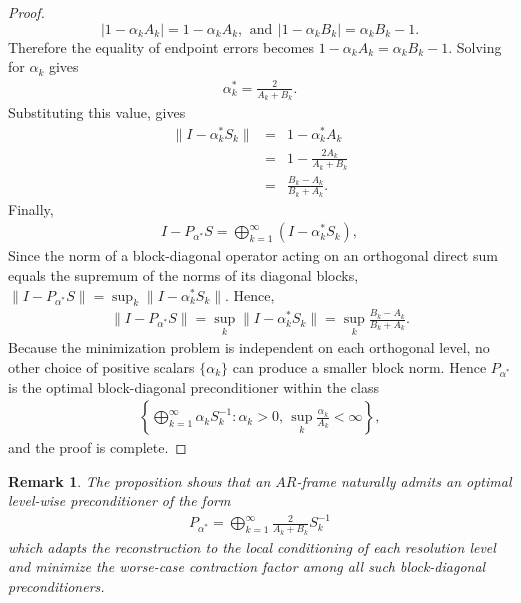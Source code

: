 \documentclass[12pt,titlepage]{amsart}
\newtheorem{rem}[thm]{Remark}
\theoremstyle{definition}
\theoremstyle{remark}
\begin{document}
\begin{proof}
$$|1-\alpha_k A_k| = 1-\alpha_k A_k, \,\ \mbox{and} \,\ |1-\alpha_k B_k| =
\alpha_k B_k-1.$$ Therefore the equality of endpoint errors
becomes $1-\alpha_k A_k = \alpha_k B_k-1$. Solving for $\alpha_k$
gives
\begin{eqnarray*}
\alpha_k^* = \frac{2}{A_k+B_k}.
\end{eqnarray*}
 Substituting this value, gives
\begin{eqnarray*}
\|I-\alpha_k^*S_k\| &=& 1-\alpha_k^*A_k\\ &=&
1-\frac{2A_k}{A_k+B_k}\\ &=& \frac{B_k-A_k}{B_k+A_k}.
\end{eqnarray*}
Finally,
\begin{eqnarray*}
I-P_{\alpha^*}S = \bigoplus_{k=1}^{\infty} (I-\alpha_k^*S_k),
\end{eqnarray*}
Since the norm of a block-diagonal operator acting on an
orthogonal direct sum equals the supremum of the norms of its
diagonal blocks,
 $\|I-P_{\alpha^*}S\| = \sup_k \|I-\alpha_k^*S_k\|$.
Hence,
\begin{eqnarray*}
\|I-P_{\alpha^*}S\| = \sup_k \|I-\alpha_k^*S_k\| = \sup_k
\frac{B_k-A_k}{B_k+A_k}.
\end{eqnarray*}
Because the minimization problem is independent on each orthogonal
level, no other choice of positive scalars $\{\alpha_k\}$ can
produce a smaller block norm. Hence $P_{\alpha^*}$ is the optimal
block-diagonal preconditioner within the class
\begin{eqnarray*}
\left\{ \bigoplus_{k=1}^{\infty}\alpha_kS_k^{-1}: \alpha_k>0,\,
\sup_k\frac{\alpha_k}{A_k}<\infty \right\},
\end{eqnarray*}
and the proof is complete.

\end{proof}

\begin{rem}
The proposition shows that an $AR$-frame naturally admits an
optimal level-wise preconditioner of the form
\begin{eqnarray*}
P_{\alpha^*} = \bigoplus_{k=1}^{\infty} \frac{2}{A_k+B_k}S_k^{-1}
\end{eqnarray*}
which adapts the reconstruction to the local conditioning of each
resolution level and minimize the worse-case contraction factor
among all such block-diagonal preconditioners.
\end{rem}
\end{document}
